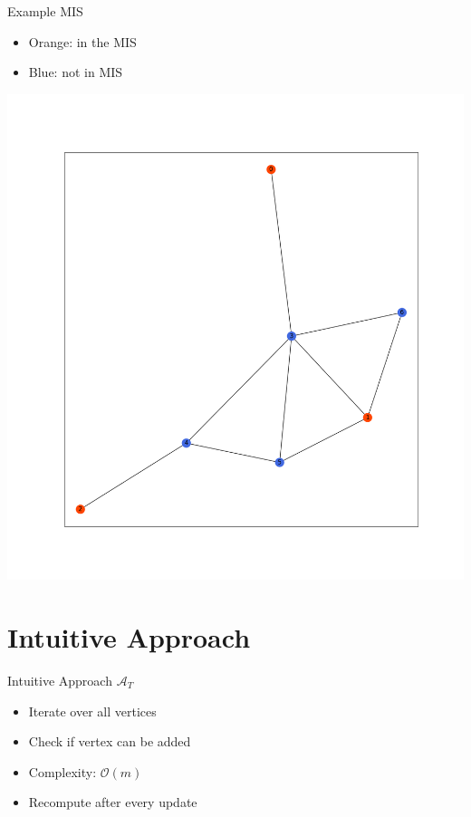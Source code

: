\documentclass{beamer}
\newcommand{\trivial}{$\mathcal{A}_T$}
\begin{document}
\begin{frame}{Example MIS}
      \begin{itemize}
        \item Orange: in the MIS
        \item Blue: not in MIS
      \end{itemize}
      \centering
      \includegraphics[height=0.7\textheight]{Figure_1.png}
\end{frame}

\section{Intuitive Approach}
\begin{frame}{Intuitive Approach \trivial}
  \begin{itemize}
    \item Iterate over all vertices
    \item Check if vertex can be added
    \item Complexity: $\mathcal{O}(m)$
    \pause
    \bigskip
    \item Recompute after every update
  \end{itemize} 
\end{frame}
\end{document}
